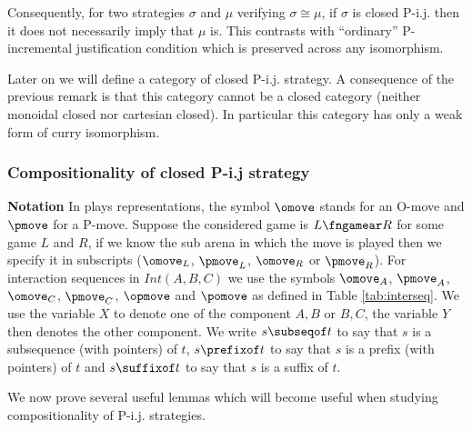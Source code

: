 Consequently, for two strategies $\sigma$ and $\mu$ verifying $\sigma \cong \mu$, if $\sigma$ is closed P-i.j. then it does not necessarily imply that $\mu$ is. This contrasts with ``ordinary'' P-incremental justification condition which is preserved across any isomorphism.

Later on we will define a category of closed P-i.j. strategy. A consequence of the previous remark is that this category cannot be a closed category (neither monoidal closed nor cartesian closed).
In particular this category has only a weak form of curry isomorphism.

\subsubsection{Compositionality of closed P-i.j strategy}

{\bf Notation} In plays representations,
the symbol $\omove$ stands for an
O-move and $\pmove$ for
a P-move.
Suppose the considered game is $L\fngamear R$
for some game $L$ and $R$, if we know the sub arena in which the move is played
then we specify it in subscripts ($\omove_L$, $\pmove_L$, $\omove_R$ or $\pmove_R$). For interaction sequences in $Int(A,B,C)$ we use
the symbols $\omove_A$, $\pmove_A$, $\omove_C$, $\pmove_C$, $\opmove$ and $\pomove$ as defined in Table \ref{tab:interseq}. We use the variable $X$ to denote one of the component $A,B$ or $B,C$, the variable  $Y$
then denotes the other component.
We write $s \subseqof t$ to say that $s$ is a subsequence (with pointers) of $t$, $s \prefixof t$ to say that $s$ is a prefix (with pointers)
of $t$ and  $s \suffixof t$ to say that $s$ is a suffix of $t$.

We now prove several useful lemmas which will become useful when studying compositionality of P-i.j. strategies.

